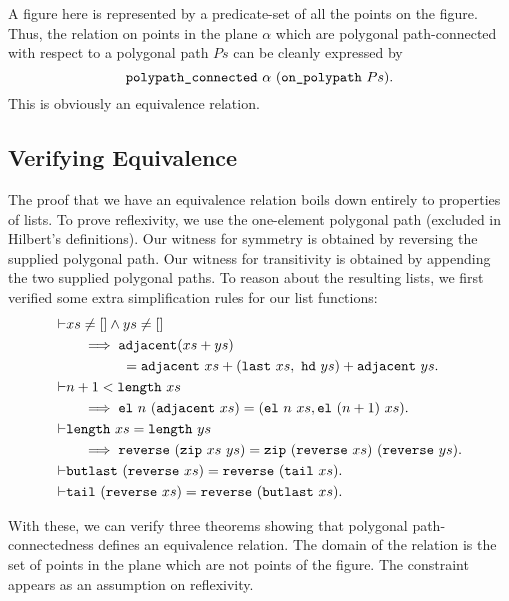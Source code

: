 A figure here is represented by a predicate-set of all the points on the figure. Thus, the relation on points in the plane $\alpha$ which are polygonal path-connected with respect to a polygonal path $Ps$ can be cleanly expressed by 
\begin{displaymath}
\code{polypath\_connected}\ \alpha\ (\code{on\_polypath}\ Ps).
\end{displaymath}
This is obviously an equivalence relation.

\subsection{Verifying Equivalence}\label{sec:segConnectEquivalence}
The proof that we have an equivalence relation boils down entirely to properties of lists. To prove reflexivity, we use the one-element polygonal path (excluded in Hilbert's definitions). Our witness for symmetry is obtained by reversing the supplied polygonal path. Our witness for transitivity is obtained by appending the two supplied polygonal paths. To reason about the resulting lists, we first verified some extra simplification rules for our list functions:
\begin{align*}
  \vdash&xs \neq [] \wedge ys \neq []\\ 
  &\quad\implies\code{adjacent}(\append{xs}{ys})\\
  &\qquad\qquad = \append{\append{\code{adjacent}\ xs}{(\code{last}\ xs,\ \code{hd}\ ys)}}{\code{adjacent}\ ys}.\\
  \vdash&n + 1 < \code{length}\ xs\\
  &\quad\implies \el{n}{(\code{adjacent}\ xs)} = (\el{n}{xs}, \el{(n+1)}{xs}).\\
  \vdash&\code{length}\ xs = \code{length}\ ys\\
  &\quad\implies\code{reverse}\ (\code{zip}\ xs\ ys) = \code{zip}\ (\code{reverse}\ xs)\ (\code{reverse}\ ys).\\
  \vdash&\code{butlast}\ (\code{reverse}\ xs) = \code{reverse}\ (\code{tail}\ xs).\\
  \vdash&\code{tail}\ (\code{reverse}\ xs) = \code{reverse}\ (\code{butlast}\ xs).
\end{align*}

With these, we can verify three theorems showing that polygonal path-connectedness defines an equivalence relation. The domain of the relation is the set of points in the plane which are not points of the figure. The constraint appears as an assumption on reflexivity. 

